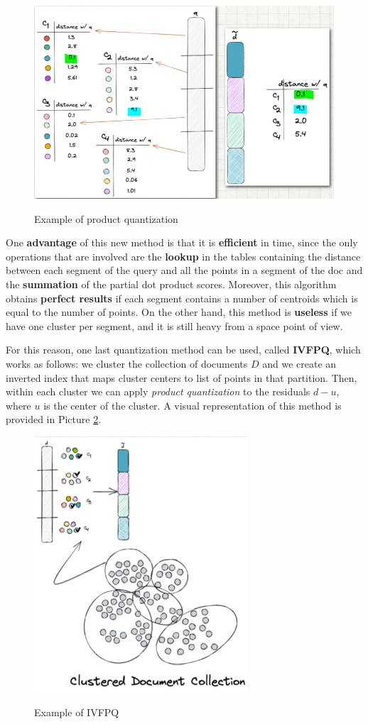 \begin{figure}[h!]
		\centering
		\includegraphics[scale = 2.0]{img/quantization_2.jpg}
        \label{quantization2}
        \caption{Example of product quantization}
\end{figure}

One \textbf{advantage} of this new method is that it is \textbf{efficient} in time, since the only operations that are involved are the \textbf{lookup} in the tables containing the distance between each segment of the query and all the points in a segment of the doc and the \textbf{summation} of the partial dot product scores. Moreover, this algorithm obtains \textbf{perfect results} if each segment contains a number of centroids which is equal to the number of points. On the other hand, this method is \textbf{useless} if we have one cluster per segment, and it is still heavy from a space point of view. 

For this reason, one last quantization method can be used, called \textbf{IVFPQ}, which works as follows: we cluster the collection of documents $D$ and we create an inverted index that maps cluster centers to list of points in that partition. Then, within each cluster we can apply \textit{product quantization} to the residuals $d - u$, where $u$ is the center of the cluster. A visual representation of this method is provided in Picture \ref{quantization3}.

\begin{figure}[h!]
		\centering
		\includegraphics[scale = 2.0]{img/ivfpq.jpg}
        \label{quantization3}
        \caption{Example of IVFPQ}
\end{figure}

